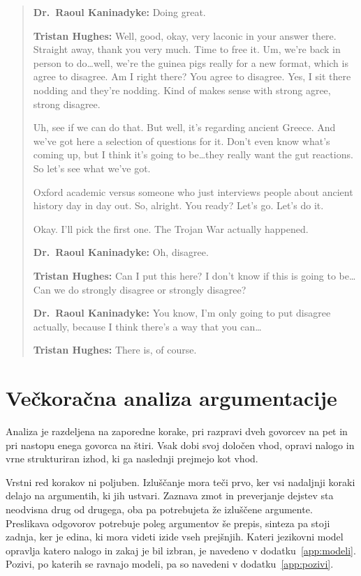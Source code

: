 \documentclass[a4paper, 12pt]{book}
\begin{document}
\begin{quote}
\footnotesize

\textbf{Dr.\ Raoul Kaninadyke:} Doing great.

\textbf{Tristan Hughes:} Well, good, okay, very laconic in your answer there. Straight away, thank you very much. Time to free it. Um, we're back in person to do\ldots well, we're the guinea pigs really for a new format, which is agree to disagree. Am I right there? You agree to disagree. Yes, I sit there nodding and they're nodding. Kind of makes sense with strong agree, strong disagree.

Uh, see if we can do that. But well, it's regarding ancient Greece. And we've got here a selection of questions for it. Don't even know what's coming up, but I think it's going to be\ldots they really want the gut reactions. So let's see what we've got.

Oxford academic versus someone who just interviews people about ancient history day in day out. So, alright. You ready? Let's go. Let's do it.

Okay. I'll pick the first one. The Trojan War actually happened.

\textbf{Dr.\ Raoul Kaninadyke:} Oh, disagree.

\textbf{Tristan Hughes:} Can I put this here? I don't know if this is going to be\ldots Can we do strongly disagree or strongly disagree?

\textbf{Dr.\ Raoul Kaninadyke:} You know, I'm only going to put disagree actually, because I think there's a way that you can\ldots

\textbf{Tristan Hughes:} There is, of course.
\end{quote}

\section{Večkoračna analiza argumentacije}
\label{sec:analiza}

Analiza je razdeljena na zaporedne korake, pri razpravi dveh govorcev na pet in pri nastopu enega govorca na štiri. Vsak dobi svoj določen vhod, opravi nalogo in vrne strukturiran izhod, ki ga naslednji prejmejo kot vhod. 

Vrstni red korakov ni poljuben. Izluščanje mora teči prvo, ker vsi nadaljnji koraki delajo na argumentih, ki jih ustvari. Zaznava zmot in preverjanje dejstev sta neodvisna drug od drugega, oba pa potrebujeta že izluščene argumente. Preslikava odgovorov potrebuje poleg argumentov še prepis, sinteza pa stoji zadnja, ker je edina, ki mora videti izide vseh prejšnjih. Kateri jezikovni model opravlja katero nalogo in zakaj je bil izbran, je navedeno v dodatku~\ref{app:modeli}. Pozivi, po katerih se ravnajo modeli, pa so navedeni v dodatku~\ref{app:pozivi}.
\end{document}

